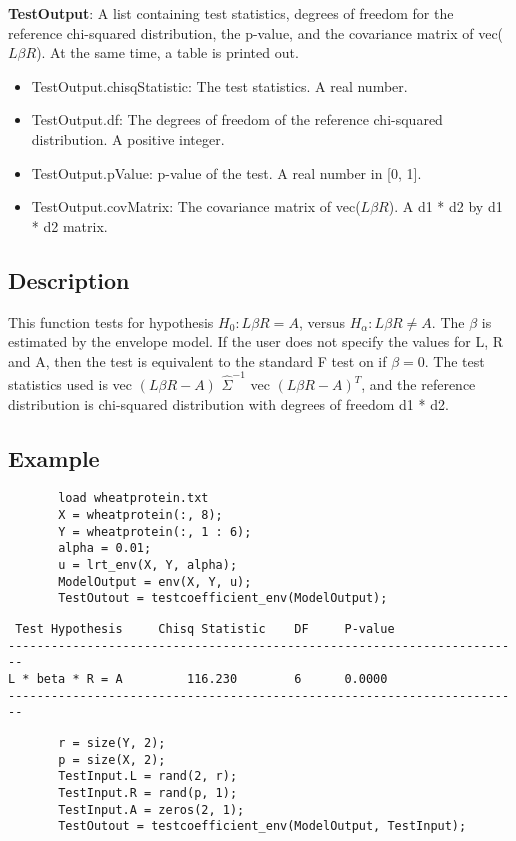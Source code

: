 \documentclass[a4paper,11pt,openany]{memoir}
\begin{document}
\begin{par}
\textbf{TestOutput}: A list containing test statistics, degrees of freedom for the reference chi-squared distribution, the p-value, and the covariance matrix of vec($L\beta R$).  At the same time, a table is printed out.
\end{par} \vspace{1em}
\begin{itemize}
\setlength{\itemsep}{-1ex}
   \item TestOutput.chisqStatistic: The test statistics. A real number.
   \item TestOutput.df: The degrees of freedom of the reference chi-squared distribution.  A positive integer.
   \item TestOutput.pValue: p-value of the test.  A real number in [0, 1].
   \item TestOutput.covMatrix: The covariance matrix of vec($L\beta R$). A d1 * d2 by d1 * d2 matrix.
\end{itemize}

\subsection*{Description}

\begin{par}
This function tests for hypothesis $H_0: L\beta R = A$, versus $H_\alpha: L\beta R\neq A$.  The $\beta$ is estimated by the envelope model.  If the user does not specify the values for L, R and A, then the test is equivalent to the standard F test on if $\beta = 0$.  The test statistics used is vec $(L\beta R - A)$ $\hat{\Sigma}^{-1}$ vec $(L\beta R - A)^{T}$, and the reference distribution is chi-squared distribution with degrees of freedom d1 * d2.
\end{par} \vspace{1em}


\subsection*{Example}


\begin{verbatim}       load wheatprotein.txt
       X = wheatprotein(:, 8);
       Y = wheatprotein(:, 1 : 6);
       alpha = 0.01;
       u = lrt_env(X, Y, alpha);
       ModelOutput = env(X, Y, u);
       TestOutout = testcoefficient_env(ModelOutput);
       \end{verbatim}
        \color{lightgray}\ttfamily \begin{verbatim}
 Test Hypothesis     Chisq Statistic    DF     P-value
------------------------------------------------------------------------
L * beta * R = A         116.230        6      0.0000
------------------------------------------------------------------------
\end{verbatim} \rmfamily
\color{black}       
\begin{verbatim}
       r = size(Y, 2);
       p = size(X, 2);
       TestInput.L = rand(2, r);
       TestInput.R = rand(p, 1);
       TestInput.A = zeros(2, 1);
       TestOutout = testcoefficient_env(ModelOutput, TestInput);\end{verbatim}
    
\end{document}
